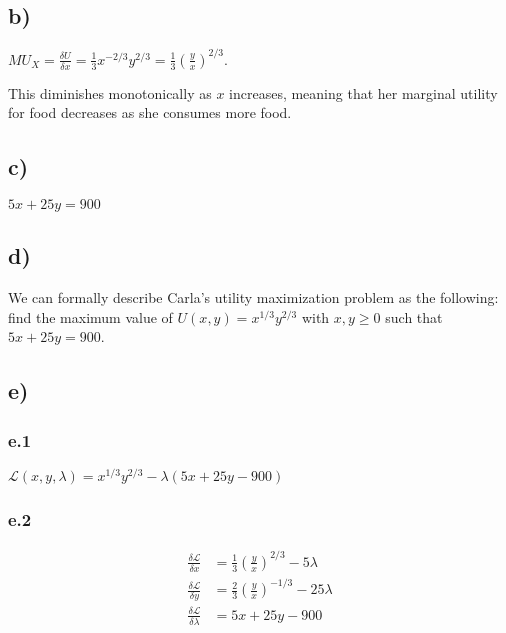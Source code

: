 \documentclass[12pt,letterpaper]{article}
\theoremstyle{definition}
\begin{document}
\subsection*{b)}

\begin{center}
		$MU_X = \frac{\delta U}{\delta x} = \frac{1}{3}x^{-2/3}y^{2/3} = \frac{1}{3}(\frac{y}{x})^{2/3}$.
\end{center}


This diminishes monotonically as $x$ increases, meaning that her marginal utility for food decreases as she consumes more food.

\subsection*{c)}

\begin{center}
		$5x + 25y = 900$ 
\end{center}

\subsection*{d)}

We can formally describe Carla's utility maximization problem as the following: find the maximum value of $U(x,y) = x^{1/3}y^{2/3}$ with $x,y \geq 0$ such that $5x + 25y = 900$.

\subsection*{e)}
\subsubsection*{e.1}
\begin{center}
		$\mathcal{L}(x,y,\lambda) = x^{1/3}y^{2/3} - \lambda(5x + 25y - 900)$
\end{center}

\subsubsection*{e.2}
\begin{align*}
		\frac{\delta \mathcal{L}}{\delta x} &= \frac{1}{3}(\frac{y}{x})^{2/3} - 5\lambda\\
		\frac{\delta \mathcal{L}}{\delta y} &= \frac{2}{3}(\frac{y}{x})^{-1/3} - 25\lambda\\
		\frac{\delta \mathcal{L}}{\delta \lambda} &= 5x + 25y - 900
\end{align*}
\end{document}
